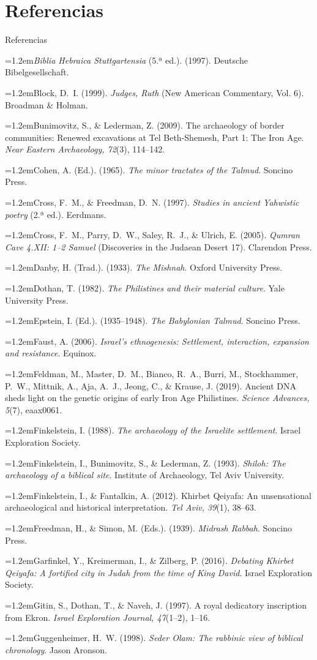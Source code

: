 \documentclass[hyperref={bookmarks=false},aspectratio=169]{beamer}
\newcommand{\refapa}[1]{\par\hangindent=1.2em\hangafter=1\noindent #1\par\vspace{3pt}}
\begin{document}
\section{Referencias}
\begin{frame}[allowframebreaks]{Referencias}
\tiny
\refapa{\emph{Biblia Hebraica Stuttgartensia} (5.ª ed.). (1997). Deutsche Bibelgesellschaft.}
\refapa{Block, D.~I. (1999). \emph{Judges, Ruth} (New American Commentary, Vol. 6). Broadman \& Holman.}
\refapa{Bunimovitz, S., \& Lederman, Z. (2009). The archaeology of border communities: Renewed excavations at Tel Beth-Shemesh, Part 1: The Iron Age. \emph{Near Eastern Archaeology, 72}(3), 114--142.}
\refapa{Cohen, A. (Ed.). (1965). \emph{The minor tractates of the Talmud}. Soncino Press.}
\refapa{Cross, F.~M., \& Freedman, D.~N. (1997). \emph{Studies in ancient Yahwistic poetry} (2.ª ed.). Eerdmans.}
\refapa{Cross, F.~M., Parry, D.~W., Saley, R.~J., \& Ulrich, E. (2005). \emph{Qumran Cave 4.XII: 1--2 Samuel} (Discoveries in the Judaean Desert 17). Clarendon Press.}
\refapa{Danby, H. (Trad.). (1933). \emph{The Mishnah}. Oxford University Press.}
\refapa{Dothan, T. (1982). \emph{The Philistines and their material culture}. Yale University Press.}
\refapa{Epstein, I. (Ed.). (1935--1948). \emph{The Babylonian Talmud}. Soncino Press.}
\refapa{Faust, A. (2006). \emph{Israel's ethnogenesis: Settlement, interaction, expansion and resistance}. Equinox.}
\refapa{Feldman, M., Master, D.~M., Bianco, R.~A., Burri, M., Stockhammer, P.~W., Mittnik, A., Aja, A.~J., Jeong, C., \& Krause, J. (2019). Ancient DNA sheds light on the genetic origins of early Iron Age Philistines. \emph{Science Advances, 5}(7), eaax0061.}
\refapa{Finkelstein, I. (1988). \emph{The archaeology of the Israelite settlement}. Israel Exploration Society.}
\refapa{Finkelstein, I., Bunimovitz, S., \& Lederman, Z. (1993). \emph{Shiloh: The archaeology of a biblical site}. Institute of Archaeology, Tel Aviv University.}
\refapa{Finkelstein, I., \& Fantalkin, A. (2012). Khirbet Qeiyafa: An unsensational archaeological and historical interpretation. \emph{Tel Aviv, 39}(1), 38--63.}
\refapa{Freedman, H., \& Simon, M. (Eds.). (1939). \emph{Midrash Rabbah}. Soncino Press.}
\refapa{Garfinkel, Y., Kreimerman, I., \& Zilberg, P. (2016). \emph{Debating Khirbet Qeiyafa: A fortified city in Judah from the time of King David}. Israel Exploration Society.}
\refapa{Gitin, S., Dothan, T., \& Naveh, J. (1997). A royal dedicatory inscription from Ekron. \emph{Israel Exploration Journal, 47}(1--2), 1--16.}
\refapa{Guggenheimer, H.~W. (1998). \emph{Seder Olam: The rabbinic view of biblical chronology}. Jason Aronson.}

\end{frame}
\end{document}
